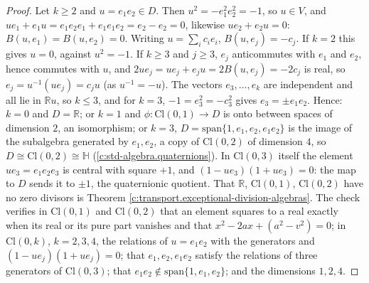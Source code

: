 \documentclass[11pt]{article}
\theoremstyle{definition}
\theoremstyle{plain}
\providecommand{\Cl}{}\renewcommand{\Cl}{\mathrm{Cl}}
\providecommand{\HH}{}\renewcommand{\HH}{\mathbb{H}}
\providecommand{\R}{}\renewcommand{\R}{\mathbb{R}}
\begin{document}
\begin{proof}
Let $k \ge 2$ and $u = e_{1}e_{2} \in D$. Then $u^{2} = -e_{1}^{2}e_{2}^{2} = -1$, so $u \in V$, and $ue_{1} + e_{1}u = e_{1}e_{2}e_{1} + e_{1}e_{1}e_{2} = e_{2} - e_{2} = 0$, likewise $ue_{2} + e_{2}u = 0$: $B(u, e_{1}) = B(u, e_{2}) = 0$. Writing $u = \sum_{i}c_{i}e_{i}$, $B(u, e_{j}) = -c_{j}$. If $k = 2$ this gives $u = 0$, against $u^{2} = -1$. If $k \ge 3$ and $j \ge 3$, $e_{j}$ anticommutes with $e_{1}$ and $e_{2}$, hence commutes with $u$, and $2ue_{j} = ue_{j} + e_{j}u = 2B(u, e_{j}) = -2c_{j}$ is real, so $e_{j} = u^{-1}(ue_{j}) = c_{j}u$ (as $u^{-1} = -u$). The vectors $e_{3}, \dots, e_{k}$ are independent and all lie in $\R u$, so $k \le 3$, and for $k = 3$, $-1 = e_{3}^{2} = -c_{3}^{2}$ gives $e_{3} = \pm e_{1}e_{2}$. Hence: $k = 0$ and $D = \R$; or $k = 1$ and $\phi: \Cl(0,1) \to D$ is onto between spaces of dimension $2$, an isomorphism; or $k = 3$, $D = \mathrm{span}\{1, e_{1}, e_{2}, e_{1}e_{2}\}$ is the image of the subalgebra generated by $e_{1}, e_{2}$, a copy of $\Cl(0,2)$ of dimension $4$, so $D \cong \Cl(0,2) \cong \HH$ (\ref{c:std-algebra.quaternions}). In $\Cl(0,3)$ itself the element $ue_{3} = e_{1}e_{2}e_{3}$ is central with square $+1$, and $(1 - ue_{3})(1 + ue_{3}) = 0$: the map to $D$ sends it to $\pm 1$, the quaternionic quotient. That $\R$, $\Cl(0,1)$, $\Cl(0,2)$ have no zero divisors is Theorem \ref{c:transport.exceptional-division-algebras}. The check verifies in $\Cl(0,1)$ and $\Cl(0,2)$ that an element squares to a real exactly when its real or its pure part vanishes and that $x^{2} - 2ax + (a^{2} - v^{2}) = 0$; in $\Cl(0,k)$, $k = 2, 3, 4$, the relations of $u = e_{1}e_{2}$ with the generators and $(1 - ue_{j})(1 + ue_{j}) = 0$; that $e_{1}, e_{2}, e_{1}e_{2}$ satisfy the relations of three generators of $\Cl(0,3)$; that $e_{1}e_{2} \notin \mathrm{span}\{1, e_{1}, e_{2}\}$; and the dimensions $1, 2, 4$.


\end{proof}
\end{document}
